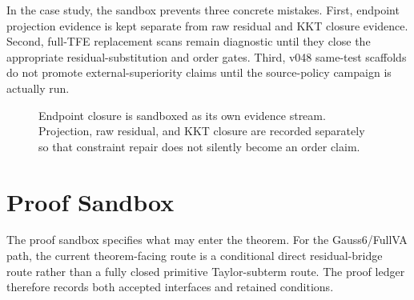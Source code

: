 \documentclass[10pt]{article}
\newcommand{\method}{Gauss6/FullVA}
\begin{document}
In the case study, the sandbox prevents three concrete mistakes. First,
endpoint projection evidence is kept separate from raw residual and KKT
closure evidence. Second, full-TFE replacement scans remain diagnostic until
they close the appropriate residual-substitution and order gates. Third,
v048 same-test scaffolds do not promote external-superiority claims until the
source-policy campaign is actually run.

\begin{figure}[t]
\centering
{}
\caption{Endpoint closure is sandboxed as its own evidence stream. Projection,
raw residual, and KKT closure are recorded separately so that constraint repair
does not silently become an order claim.}
\label{fig:endpoint}
\end{figure}

\section{Proof Sandbox}

The proof sandbox specifies what may enter the theorem. For the \method{}
path, the current theorem-facing route is a conditional direct residual-bridge
route rather than a fully closed primitive Taylor-subterm route. The proof
ledger therefore records both accepted interfaces and retained conditions.
\end{document}
